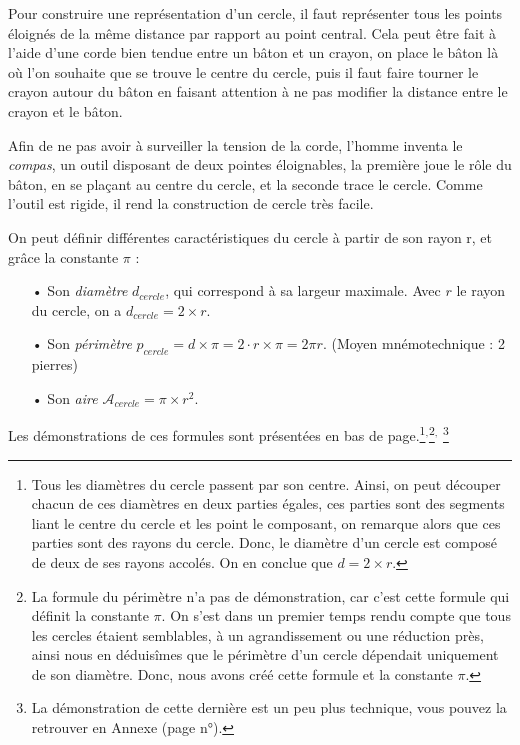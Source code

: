 \documentclass[a4paper, twoside]{article}
\begin{document}
Pour construire une représentation d'un cercle,
il faut représenter tous les points éloignés de la même distance par rapport au point central.
Cela peut être fait à l'aide d'une corde bien tendue entre un bâton et un crayon,
on place le bâton là où l'on souhaite que se trouve le centre du cercle,
puis il faut faire tourner le crayon autour du bâton en faisant attention à ne pas modifier
la distance entre le crayon et le bâton.

Afin de ne pas avoir à surveiller la tension de la corde, l'homme inventa le \emph{compas},
un outil disposant de deux pointes éloignables, la première joue le rôle du bâton,
en se plaçant au centre du cercle, et la seconde trace le cercle.
Comme l'outil est rigide, il rend la construction de cercle très facile.

\medbreak

On peut définir différentes caractéristiques du cercle à partir de son rayon r,
et grâce la constante $\pi$ :

\medbreak

\begin{itemize}
	\item[•] Son \emph{diamètre} $d_{cercle}$, qui correspond à sa largeur maximale.
	      Avec $r$ le rayon du cercle, on a $d_{cercle} = 2 \times r$.
	      \smallbreak
	\item[•] Son \emph{périmètre} $p_{cercle} = d \times \pi = 2 \cdot r \times \pi = 2 \pi r$. (Moyen mnémotechnique : 2 pierres)
	      \smallbreak
	\item[•] Son \emph{aire} $\mathcal{A}_{cercle} = \pi \times r^2$.
\end{itemize}

\medbreak

Les démonstrations de ces formules sont présentées en bas de page.\footnote{Tous les diamètres du cercle passent par son centre.
	Ainsi, on peut découper chacun de ces diamètres en deux parties égales,
	ces parties sont des segments liant le centre du cercle et les point le composant,
	on remarque alors que ces parties sont des rayons du cercle.
	Donc, le diamètre d'un cercle est composé de deux de ses rayons accolés. On en conclue que $d = 2 \times r$.}$^{, }$\footnote{
	La formule du périmètre n'a pas de démonstration,
	car c'est cette formule qui définit la constante $\pi$.
	On s'est dans un premier temps rendu compte que tous les cercles étaient semblables,
	à un agrandissement ou une réduction près, ainsi nous en déduisîmes que le périmètre d'un cercle
	dépendait uniquement de son diamètre.
	Donc, nous avons créé cette
	formule et la constante
	$\pi$.}$^{, }$
\footnote{
	La démonstration de cette dernière est un peu plus technique,
	vous pouvez la retrouver en Annexe (page n°\pageref{demo_formule_aire_cercle}).}
\end{document}
